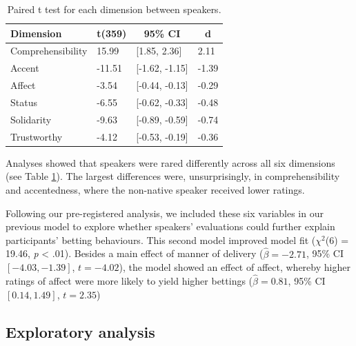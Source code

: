 \documentclass[
  man,floatsintext]{apa7}
\begin{document}
\begin{table}[tbp]

\begin{center}
\begin{threeparttable}

\caption{\label{tab:tab6}Paired t test for each dimension between speakers.}

\begin{tabular}{llll}
\toprule
Dimension & \multicolumn{1}{c}{t(359)} & \multicolumn{1}{c}{95\% CI} & \multicolumn{1}{c}{d}\\
\midrule
Comprehensibility & 15.99 & {}[1.85, 2.36] & 2.11\\
Accent & -11.51 & {}[-1.62, -1.15] & -1.39\\
Affect & -3.54 & {}[-0.44, -0.13] & -0.29\\
Status & -6.55 & {}[-0.62, -0.33] & -0.48\\
Solidarity & -9.63 & {}[-0.89, -0.59] & -0.74\\
Trustworthy & -4.12 & {}[-0.53, -0.19] & -0.36\\
\bottomrule
\end{tabular}

\end{threeparttable}
\end{center}

\end{table}

Analyses showed that speakers were rared differently across all six dimensions (see Table \ref{tab:tab6}). The largest differences were, unsurprisingly, in comprehensibility and accentedness, where the non-native speaker received lower ratings.

Following our pre-registered analysis, we included these six variables in our previous model to explore whether speakers' evaluations could further explain participants' betting behaviours. This second model improved model fit (\(\chi^2\)(6) = 19.46, \emph{p} \textless{} .01). Besides a main effect of manner of delivery (\(\hat{\beta} = -2.71\), 95\% CI \([-4.03, -1.39]\), \(t = -4.02\)), the model showed an effect of affect, whereby higher ratings of affect were more likely to yield higher bettings (\(\hat{\beta} = 0.81\), 95\% CI \([0.14, 1.49]\), \(t = 2.35\))

\hypertarget{exploratory-analysis}{%
\subsection{Exploratory analysis}\label{exploratory-analysis}}
\end{document}
